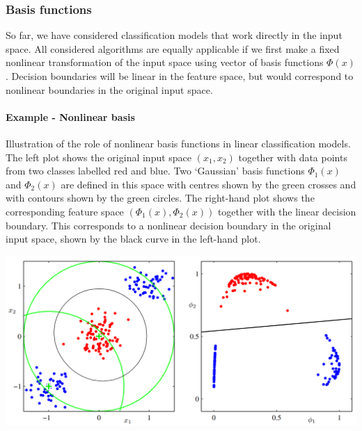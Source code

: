 \documentclass[main.tex]{subfiles}
\begin{document}
\newpage
\subsubsection{Basis functions}
So far, we have considered classification models that work directly in the input space. All considered algorithms are equally applicable if we first make a fixed nonlinear transformation of the input space using vector of basis functions $\Phi(x)$. Decision boundaries will be linear in the feature space, but would correspond to nonlinear boundaries in the original input space.
\paragraph{Example - Nonlinear basis}
Illustration of the role of nonlinear basis functions in linear classification models. The left plot shows the original input space $(x_1, x_2)$ together with data points from two classes labelled red and blue. Two
‘Gaussian’ basis functions $\Phi_1(x)$ and $\Phi_2(x)$ are defined in this space with centres shown by the green crosses
and with contours shown by the green circles. The right-hand plot shows the corresponding feature space $(\Phi_1(x), \Phi_2(x))$ together with the linear decision boundary. This corresponds to a nonlinear decision boundary in the original input space, shown by the black curve in the left-hand plot.
\begin{center}
    \includegraphics[scale=0.50]{img/LS_Gaussian_Basis.PNG}
\end{center}
\end{document}
